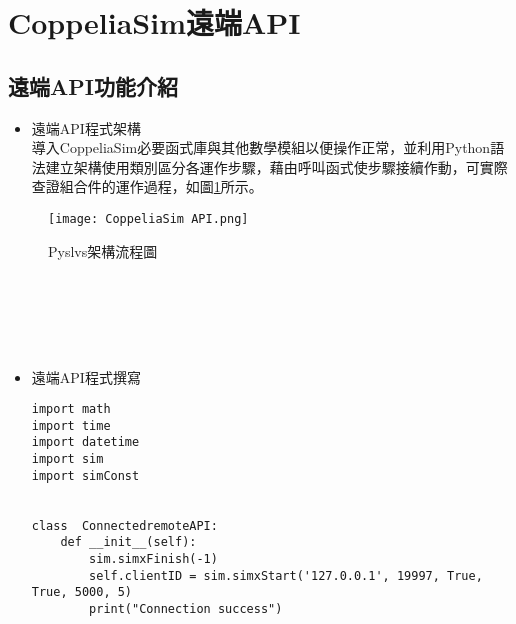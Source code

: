 \documentclass[14pt,a4paper]{report}  %
\newcommand{\fourteen}{\fontsize{14pt}{\baselineskip}\selectfont}%
\begin{document}
{{{{      \section{CoppeliaSim遠端API}
      \subsection{遠端API功能介紹}
      \fourteen {利用組合件放入CoppeliaSim中進行從屬關係的架設與半自動設定物理條件，藉由API(Application Programming Interface)連接CoppeliaSim遠端操控馬達使組合件作動，以查證組合件之機構在運作時的實際狀況。}
    
      \begin{itemize}
     \item 遠端API程式架構
     \hspace*{\fill} \\
     導入CoppeliaSim必要函式庫與其他數學模組以便操作正常，並利用Python語法建立架構使用類別區分各運作步驟，藉由呼叫函式使步驟接續作動，可實際查證組合件的運作過程，如圖\ref{fig_coppeliasim API:scale}所示。
     \end{itemize}
     
     \begin{figure}[hbt!]
        \centering
        \texttt{[image: CoppeliaSim API.png]} 
        \caption{Pyslvs架構流程圖}
        \label{fig_coppeliasim API:scale}
        \end{figure}
        
     \hspace*{\fill} \\
     \hspace*{\fill} \\
     \hspace*{\fill} \\
     \hspace*{\fill} \\
     \begin{itemize}
     \item 遠端API程式撰寫
     \hspace*{\fill} \\
		\begin{lstlisting}[caption=遠端API程式架構]
import math 
import time
import datetime
import sim 
import simConst


class  ConnectedremoteAPI:
    def __init__(self):
        sim.simxFinish(-1)
        self.clientID = sim.simxStart('127.0.0.1', 19997, True, True, 5000, 5)
        print("Connection success")
          

\end{lstlisting}
\end{itemize}}}}}
\end{document}
